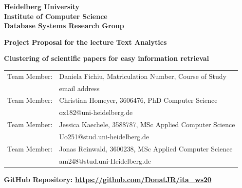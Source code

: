 \documentclass[
     12pt,         %
     a4paper,      %
     BCOR10mm,     %
     DIV14,        %
     ]{article}
\begin{document}
\begin{titlepage}


\vspace*{1cm}
\begin{center}
\vspace*{3cm}
\textbf{ 
\Large Heidelberg University\\
\smallskip
\Large Institute of Computer Science\\
\smallskip
\Large Database Systems Research Group\\
\smallskip
}

\vspace{3cm}

\textbf{\large Project Proposal for the lecture Text Analytics}

\vspace{0.5\baselineskip}
{\huge
\textbf{Clustering of scientific papers for easy information retrieval}
}
\end{center}

\vfill 

{\large
\begin{tabular}[l]{ll}
Team Member: & Daniela Fichiu, Matriculation Number, Course of Study\\
  & email address\\
Team Member: & Christian Homeyer, 3606476, PhD Computer Science \\
  & ox182@uni-heidelberg.de\\
Team Member: & Jessica Kaechele, 3588787, MSc Applied Computer Science\\
  & Uo251@stud.uni-heidelberg.de\\
Team Member: & Jonas Reinwald, 3600238, MSc Applied Computer Science\\
  & am248@stud.uni-Heidelberg.de\\
  
\end{tabular}
}

{
  \textbf{GitHub Repository: \url{https://github.com/DonatJR/ita_ws20}}
}

\end{titlepage}











\end{document}
